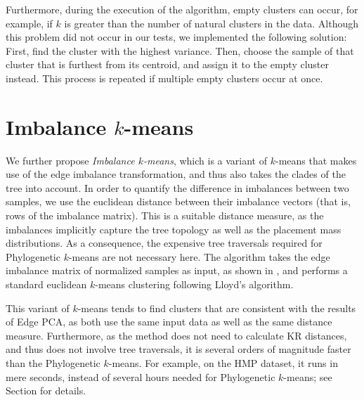 Furthermore, during the execution of the algorithm, empty clusters can occur,
for example, if $k$ is greater than the number of natural clusters in the data.
Although this problem did not occur in our tests, we implemented the following solution:
First, find the cluster with the highest variance.
Then, choose the sample of that cluster that is furthest from its centroid,
and assign it to the empty cluster instead.
This process is repeated if multiple empty clusters occur at once.


\section{Imbalance \texorpdfstring{$k$-means}{k-means}}
\label{ch:Clustering:sec:ImbalanceKmeans}

We further propose \emph{Imbalance $k$-means},
which is a variant of $k$-means that makes use of the edge imbalance transformation,
and thus also takes the clades of the tree into account.
In order to quantify the difference in imbalances between two samples,
we use the euclidean distance between their imbalance vectors (that is, rows of the imbalance matrix).
This is a suitable distance measure,
as the imbalances implicitly capture the tree topology as well as the placement mass distributions.
As a consequence, the expensive tree traversals required for Phylogenetic $k$-means are not necessary here.
The algorithm takes the edge imbalance matrix of normalized samples as input,
as shown in ,
and performs a standard euclidean $k$-means clustering following Lloyd's algorithm.

This variant of $k$-means tends to find clusters that are consistent with the results of Edge PCA,
as both use the same input data as well as the same distance measure.
Furthermore, as the method does not need to calculate KR distances,
and thus does not involve tree traversals,
it is several orders of magnitude faster than the Phylogenetic $k$-means.
For example, on the \ac{HMP} dataset, it runs in mere seconds, instead of several hours needed for Phylogenetic $k$-means;
see Section  for details.

